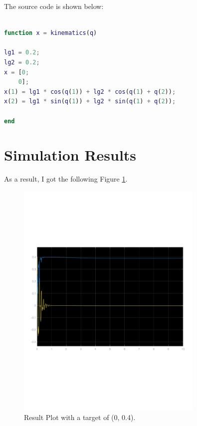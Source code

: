 \documentclass{article}
\begin{document}
The source code is shown below:
\begin{lstlisting}[language=Matlab,  basicstyle=\small\ttfamily]

function x = kinematics(q)

lg1 = 0.2;
lg2 = 0.2;
x = [0;
    0];
x(1) = lg1 * cos(q(1)) + lg2 * cos(q(1) + q(2));
x(2) = lg1 * sin(q(1)) + lg2 * sin(q(1) + q(2));

end

\end{lstlisting}

\section{Simulation Results}

As a result, I got the following Figure \ref{fig:result_task_space_plot}. \\
\begin{figure}[ht]
    \centering
    \includegraphics[width=0.8\textwidth]{figures/result_task_space.pdf}
    \caption{Result Plot with a target of (0, 0.4).}
    \label{fig:result_task_space_plot}
\end{figure}



\setcounter{section}{0}
\end{document}
